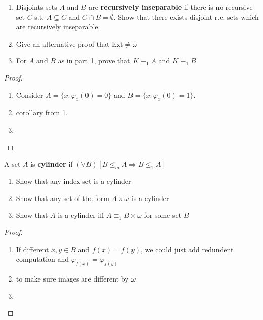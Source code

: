 \documentclass[11pt]{article}
\begin{document}
\begin{exercise}
\label{ex1.4.22}
\begin{enumerate}
\item Disjoints sets \(A\) and \(B\) are \textbf{recursively inseparable} if there is no
recursive set \(C\) s.t. \(A\subseteq C\) and \(C\cap B=\emptyset\). Show that
there exists disjoint r.e. sets which are recursively inseparable.
\item Give an alternative proof that \(\text{Ext}\neq\omega\)
\item For \(A\) and \(B\) as in part 1, prove that \(K\equiv_1 A\) and \(K\equiv_1 B\)
\end{enumerate}
\end{exercise}
\begin{proof}
\begin{enumerate}
\item Consider \(A=\{x:\varphi_x(0)=0\}\) and \(B=\{x:\varphi_x(0)=1\}\).
\item corollary from 1.
\item 
\end{enumerate}
\end{proof}

\begin{exercise}
A set \(A\) is \textbf{cylinder} if \((\forall B)[B\le_m A\Longrightarrow B\le_1 A]\)
\begin{enumerate}
\item Show that any index set is a cylinder
\item Show that any set of the form \(A\times\omega\) is a cylinder
\item Show that \(A\) is a cylinder iff \(A\equiv_1 B\times\omega\) for some set \(B\)
\end{enumerate}
\end{exercise}

\begin{proof}
\begin{enumerate}
\item If different \(x,y\in B\) and \(f(x)=f(y)\), we could just add redundent
computation and \(\varphi_{f(x)}=\varphi_{f(y)}\)
\item to make sure images are different by \(\omega\)
\item 
\end{enumerate}
\end{proof}
\end{document}
